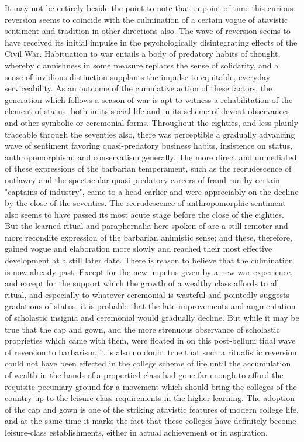 \documentclass[12pt]{report}
\begin{document}
It may not be entirely beside the point to note that in point of time
this curious reversion seems to coincide with the culmination of a
certain vogue of atavistic sentiment and tradition in other directions
also. The wave of reversion seems to have received its initial impulse
in the psychologically disintegrating effects of the Civil War.
Habituation to war entails a body of predatory habits of thought,
whereby clannishness in some measure replaces the sense of solidarity,
and a sense of invidious distinction supplants the impulse to equitable,
everyday serviceability. As an outcome of the cumulative action of these
factors, the generation which follows a season of war is apt to witness
a rehabilitation of the element of status, both in its social life and
in its scheme of devout observances and other symbolic or ceremonial
forms. Throughout the eighties, and less plainly traceable through the
seventies also, there was perceptible a gradually advancing wave of
sentiment favoring quasi-predatory business habits, insistence on
status, anthropomorphism, and conservatism generally. The more direct
and unmediated of these expressions of the barbarian temperament, such
as the recrudescence of outlawry and the spectacular quasi-predatory
careers of fraud run by certain "captains of industry", came to a
head earlier and were appreciably on the decline by the close of the
seventies. The recrudescence of anthropomorphic sentiment also seems to
have passed its most acute stage before the close of the eighties. But
the learned ritual and paraphernalia here spoken of are a still remoter
and more recondite expression of the barbarian animistic sense; and
these, therefore, gained vogue and elaboration more slowly and reached
their most effective development at a still later date. There is reason
to believe that the culmination is now already past. Except for the new
impetus given by a new war experience, and except for the support which
the growth of a wealthy class affords to all ritual, and especially to
whatever ceremonial is wasteful and pointedly suggests gradations of
status, it is probable that the late improvements and augmentation of
scholastic insignia and ceremonial would gradually decline. But while it
may be true that the cap and gown, and the more strenuous observance
of scholastic proprieties which came with them, were floated in on this
post-bellum tidal wave of reversion to barbarism, it is also no doubt
true that such a ritualistic reversion could not have been effected in
the college scheme of life until the accumulation of wealth in the
hands of a propertied class had gone far enough to afford the requisite
pecuniary ground for a movement which should bring the colleges of the
country up to the leisure-class requirements in the higher learning. The
adoption of the cap and gown is one of the striking atavistic features
of modern college life, and at the same time it marks the fact that
these colleges have definitely become leisure-class establishments,
either in actual achievement or in aspiration.
\end{document}
